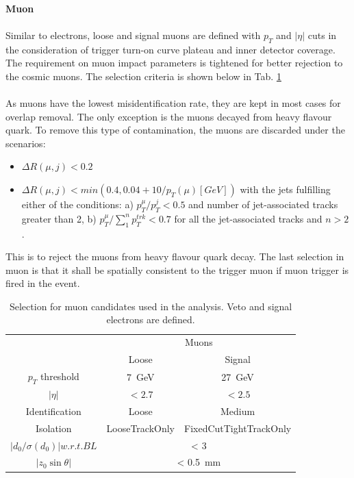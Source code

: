 \noindent
\\{\bf Muon}
\\
\\Similar to electrons, loose and signal muons are defined with $p_{T}$ and $|\eta|$ cuts in the consideration of trigger turn-on curve plateau and inner detector coverage. The requirement on muon impact parameters is tightened for better rejection to the cosmic muons. The selection criteria is shown below in Tab. \ref{Tab:mudefin}
\\
\\As muons have the lowest misidentification rate, they are kept in most cases for overlap removal. The only exception is the muons decayed from heavy flavour quark. To remove this type of contamination, the muons are discarded under the scenarios:
\begin{itemize}
	\item $\Delta R(\mu,j)<0.2$
	\item $\Delta R(\mu,j)<min(0.4,0.04+10/p_{T}(\mu)[GeV])$ with the jets fulfilling either of the conditions: a) $p_{T}^{\mu}/p_{T}^j<0.5$ and number of jet-associated tracks greater than 2, b) $p_{T}^{\mu}/\sum^{n}_{1} p_{T}^{trk}<0.7$ for all the jet-associated tracks and $n>2$.
\end{itemize}
This is to reject the muons from heavy flavour quark decay. The last selection in muon is that it shall be spatially consistent to the trigger muon if muon trigger is fired in the event. 
\begin{table}[htb]
	\caption{Selection for muon candidates used in the analysis. Veto and signal electrons are defined.}\label{Tab:mudefin}
	\centering
	\begin{tabular}{|c||c|c|}
   \hline
& \multicolumn{2}{c|}{Muons}\\
\cline{2-3}
&  Loose & Signal  \\
\hline
$p_T$ threshold &  7~GeV & 27~GeV  \\
\hline
$| \eta |$      &  $< 2.7$ & $< 2.5$   \\
\hline
Identification  &  Loose & Medium  \\
\hline
Isolation       &   LooseTrackOnly & FixedCutTightTrackOnly  \\
\hline
$|d_0/\sigma(d_0)| w.r.t. BL$ &   \multicolumn{2}{|c|}{< 3} \\
\hline
$|z_0\sin\theta| $ &   \multicolumn{2}{|c|}{< 0.5~mm} \\
\hline
	\end{tabular}
\end{table}
